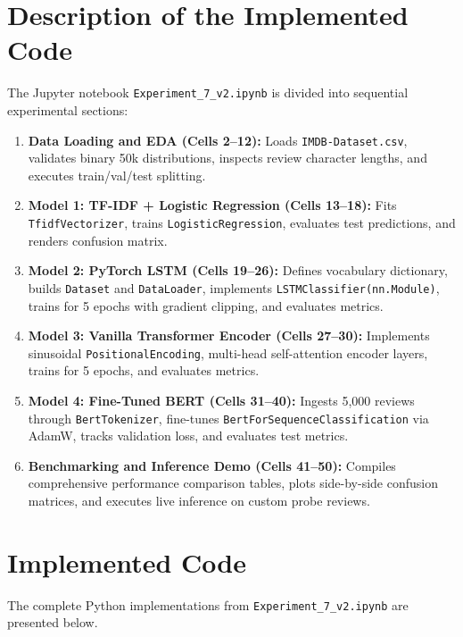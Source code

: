 \documentclass[12pt,a4paper]{report}
\begin{document}
\section{Description of the Implemented Code}
The Jupyter notebook \texttt{Experiment\_7\_v2.ipynb} is divided into sequential experimental sections:
\begin{enumerate}
    \item \textbf{Data Loading and EDA (Cells 2--12):} Loads \texttt{IMDB-Dataset.csv}, validates binary 50k distributions, inspects review character lengths, and executes train/val/test splitting.
    \item \textbf{Model 1: TF-IDF + Logistic Regression (Cells 13--18):} Fits \texttt{TfidfVectorizer}, trains \texttt{LogisticRegression}, evaluates test predictions, and renders confusion matrix.
    \item \textbf{Model 2: PyTorch LSTM (Cells 19--26):} Defines vocabulary dictionary, builds \texttt{Dataset} and \texttt{DataLoader}, implements \texttt{LSTMClassifier(nn.Module)}, trains for 5 epochs with gradient clipping, and evaluates metrics.
    \item \textbf{Model 3: Vanilla Transformer Encoder (Cells 27--30):} Implements sinusoidal \texttt{PositionalEncoding}, multi-head self-attention encoder layers, trains for 5 epochs, and evaluates metrics.
    \item \textbf{Model 4: Fine-Tuned BERT (Cells 31--40):} Ingests 5,000 reviews through \texttt{BertTokenizer}, fine-tunes \texttt{BertForSequenceClassification} via AdamW, tracks validation loss, and evaluates test metrics.
    \item \textbf{Benchmarking and Inference Demo (Cells 41--50):} Compiles comprehensive performance comparison tables, plots side-by-side confusion matrices, and executes live inference on custom probe reviews.
\end{enumerate}

\section{Implemented Code}
The complete Python implementations from \texttt{Experiment\_7\_v2.ipynb} are presented below.
\end{document}

